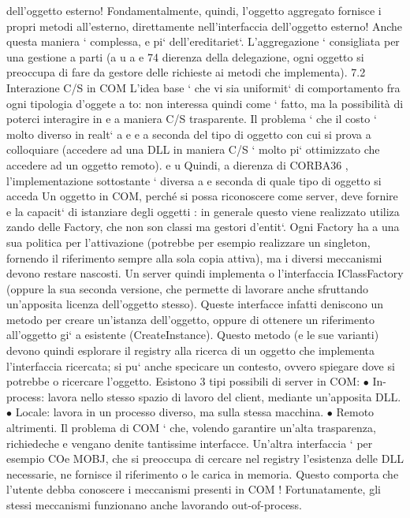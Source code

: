 \documentclass[a4paper,12pt]{article}
\begin{document}
dell'oggetto esterno! Fondamentalmente, quindi, l'oggetto aggregato fornisce i propri metodi all'esterno, direttamente
nell'interfaccia dell'oggetto esterno! Anche questa maniera ` complessa,
e
pi` dell'ereditariet`. L'aggregazione ` consigliata per una gestione a parti (a
u
a
e
74
\newpage
dierenza della delegazione, ogni oggetto si preoccupa di fare da gestore delle
richieste ai metodi che implementa).
7.2
Interazione C/S in COM
L'idea base ` che vi sia uniformit` di comportamento fra ogni tipologia d'oggete
a
to: non interessa quindi come ` fatto, ma la possibilità di poterci interagire in
e
a
maniera C/S trasparente. Il problema ` che il costo ` molto diverso in realt` a
e
e
a
seconda del tipo di oggetto con cui si prova a colloquiare (accedere ad una DLL
in maniera C/S ` molto pi` ottimizzato che accedere ad un oggetto remoto).
e
u
Quindi, a dierenza di CORBA36 , l'implementazione sottostante ` diversa a
e
seconda di quale tipo di oggetto si acceda
Un oggetto in COM, perché si possa riconoscere come server, deve fornire
e
la capacit` di istanziare degli oggetti : in generale questo viene realizzato utiliza
zando delle Factory, che non son classi ma gestori d'entit`. Ogni Factory ha
a
una sua politica per l'attivazione (potrebbe per esempio realizzare un singleton,
fornendo il riferimento sempre alla sola copia attiva), ma i diversi meccanismi
devono restare nascosti.
Un server quindi implementa o l'interfaccia IClassFactory (oppure la sua
seconda versione, che permette di lavorare anche sfruttando un'apposita licenza dell'oggetto stesso). Queste interfacce
infatti deniscono un metodo per
creare un'istanza dell'oggetto, oppure di ottenere un riferimento all'oggetto gi`
a
esistente (CreateInstance). Questo metodo (e le sue varianti) devono quindi
esplorare il registry alla ricerca di un oggetto che implementa l'interfaccia ricercata; si pu` anche specicare un
contesto, ovvero spiegare dove si potrebbe
o
ricercare l'oggetto.
Esistono 3 tipi possibili di server in COM:
$\bullet$ In-process: lavora nello stesso spazio di lavoro del client, mediante un'apposita DLL.
$\bullet$ Locale: lavora in un processo diverso, ma sulla stessa macchina.
$\bullet$ Remoto altrimenti.
Il problema di COM ` che, volendo garantire un'alta trasparenza, richiedeche
e
vengano denite tantissime interfacce. Un'altra interfaccia ` per esempio COe
MOBJ, che si preoccupa di cercare nel registry l'esistenza delle DLL necessarie,
ne fornisce il riferimento o le carica in memoria. Questo comporta che l'utente debba conoscere i meccanismi presenti in
COM ! Fortunatamente, gli stessi
meccanismi funzionano anche lavorando out-of-process.
\end{document}
